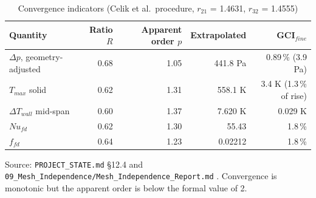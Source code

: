 \begin{table}[htbp]
\centering
\footnotesize
\caption{Convergence indicators (Celik et al.\ procedure, $r_{21}$ = 1.4631, $r_{32}$ = 1.4555)}
\label{tab:gci}
\begin{tabular}{lrrrr}
\toprule
Quantity & Ratio $R$ & Apparent order $p$ & Extrapolated & GCI$_{fine}$ \\
\midrule
$\Delta p$, geometry-adjusted & 0.68 & 1.05 & 441.8 Pa & 0.89\,\% (3.9 Pa) \\
$T_{max}$ solid & 0.62 & 1.31 & 558.1 K & 3.4 K (1.3\,\% of rise) \\
$\Delta T_{wall}$ mid-span & 0.60 & 1.37 & 7.620 K & 0.029 K \\
$Nu_{fd}$ & 0.62 & 1.30 & 55.43 & 1.8\,\% \\
$f_{fd}$ & 0.64 & 1.23 & 0.02212 & 1.8\,\% \\
\bottomrule
\end{tabular}
\par\smallskip\parbox{\linewidth}{\footnotesize\raggedright Source: \texttt{PROJECT\_STATE.md} \S12.4 and \texttt{09\_Mesh\_Independence/Mesh\_Independence\_Report.md} \cite{celik2008}. Convergence is monotonic but the apparent order is below the formal value of 2.}
\end{table}
